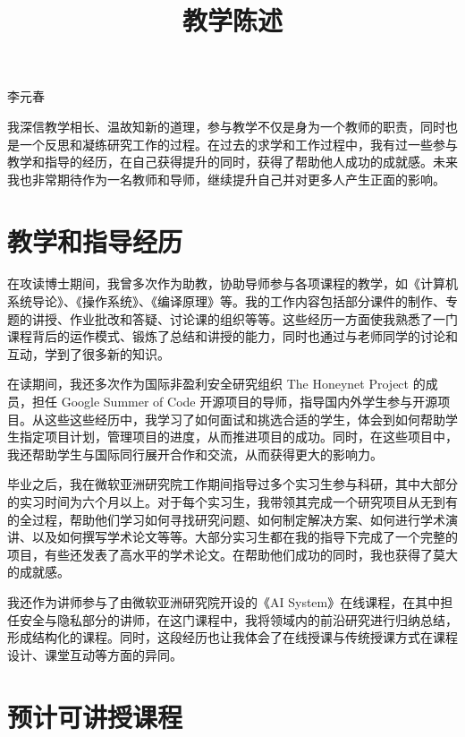 \documentclass[12pt]{article}
\begin{document}

\title{教学陈述}

\maketitle

\begin{center} {李元春} \end{center}


我深信教学相长、温故知新的道理，参与教学不仅是身为一个教师的职责，同时也是一个反思和凝练研究工作的过程。在过去的求学和工作过程中，我有过一些参与教学和指导的经历，在自己获得提升的同时，获得了帮助他人成功的成就感。未来我也非常期待作为一名教师和导师，继续提升自己并对更多人产生正面的影响。

\section{教学和指导经历}

在攻读博士期间，我曾多次作为助教，协助导师参与各项课程的教学，如《计算机系统导论》、《操作系统》、《编译原理》等。我的工作内容包括部分课件的制作、专题的讲授、作业批改和答疑、讨论课的组织等等。这些经历一方面使我熟悉了一门课程背后的运作模式、锻炼了总结和讲授的能力，同时也通过与老师同学的讨论和互动，学到了很多新的知识。

在读期间，我还多次作为国际非盈利安全研究组织 The Honeynet Project 的成员，担任 Google Summer of Code 开源项目的导师，指导国内外学生参与开源项目。从这些这些经历中，我学习了如何面试和挑选合适的学生，体会到如何帮助学生指定项目计划，管理项目的进度，从而推进项目的成功。同时，在这些项目中，我还帮助学生与国际同行展开合作和交流，从而获得更大的影响力。

毕业之后，我在微软亚洲研究院工作期间指导过多个实习生参与科研，其中大部分的实习时间为六个月以上。对于每个实习生，我带领其完成一个研究项目从无到有的全过程，帮助他们学习如何寻找研究问题、如何制定解决方案、如何进行学术演讲、以及如何撰写学术论文等等。大部分实习生都在我的指导下完成了一个完整的项目，有些还发表了高水平的学术论文。在帮助他们成功的同时，我也获得了莫大的成就感。

我还作为讲师参与了由微软亚洲研究院开设的《AI System》在线课程，在其中担任安全与隐私部分的讲师，在这门课程中，我将领域内的前沿研究进行归纳总结，形成结构化的课程。同时，这段经历也让我体会了在线授课与传统授课方式在课程设计、课堂互动等方面的异同。


\section{预计可讲授课程}
\end{document}
